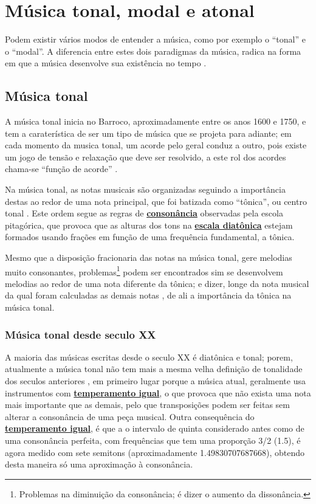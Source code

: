 
\section{Música tonal, modal e atonal}
\label{sec:ModosEntenderMusica}
Podem existir vários modos de entender a música, como por exemplo o ``tonal'' e o ``modal''.
A diferencia entre estes dois paradigmas da música, 
radica na forma em que a música desenvolve sua existência no tempo \cite[pp. 155]{arbones2012armonia}.


\subsection{Música tonal}
\label{sec:MusicaTonal}
A música tonal inicia no Barroco, aproximadamente entre os anos 1600 e 1750,
e tem a  caraterística de ser um tipo de  música que se projeta para adiante;
em cada momento da musica tonal, um acorde pelo geral conduz a outro,
pois existe um jogo de tensão e relaxação que deve ser resolvido,
a este rol dos acordes chama-se ``função de acorde'' \cite[pp. 155-156]{arbones2012armonia}.


Na música tonal, 
as notas musicais são organizadas seguindo a importância destas ao redor de uma nota  principal,
que foi batizada como ``tônica'', ou centro tonal \cite[pp. 27]{arbones2012armonia}.
Este ordem segue as regras de \hyperref[ref:paginadiatonicanumerica]{\textbf{consonância}} observadas pela escola pitagórica,
que provoca que as alturas dos tons na \hyperref[sec:pos:Diatonica]{\textbf{escala diatônica}} 
estejam formados usando frações em função de uma frequência fundamental, a tônica.

Mesmo que a disposição fracionaria das notas na música tonal, gere melodias muito consonantes,
problemas\footnote{Problemas na diminuição da consonância; é dizer o aumento da dissonância.} 
podem ser encontrados sim se desenvolvem melodias ao redor de uma nota diferente da tônica;
e dizer, longe da nota musical da qual foram calculadas as demais notas \cite[pp. 28]{arbones2012armonia},
de ali a importância da tônica na música tonal.

\subsubsection{Música tonal desde seculo XX}
A maioria das músicas  escritas desde o seculo XX é diatônica e tonal;
porem, atualmente a música tonal não tem mais a mesma velha definição de tonalidade dos seculos anteriores  \cite[pp. 63]{copland1974ouvir},
em primeiro lugar porque a música atual, geralmente usa instrumentos com \hyperref[subsec:tempigual]{\textbf{temperamento igual}},
o que provoca que não exista uma nota mais importante que as demais, 
pelo que transposições podem ser feitas sem alterar a consonância de uma peça musical.
Outra consequência do \hyperref[subsec:tempigual]{\textbf{temperamento igual}},
é que a o intervalo de quinta considerado antes como de uma consonância perfeita,
com frequências que tem uma proporção 3/2 (1.5), é agora medido com sete semitons (aproximadamente 1.49830707687668),
obtendo desta maneira só uma aproximação à consonância.


